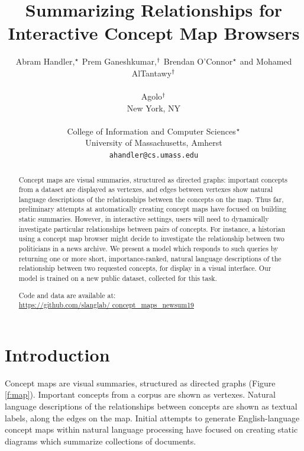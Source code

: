 \documentclass[11pt,a4paper]{article}
\title{Summarizing Relationships for Interactive Concept Map Browsers}
\author{Abram Handler,$^{\star}$ Prem Ganeshkumar,$^{\dagger}$ Brendan O'Connor$^{\star}$ and Mohamed AlTantawy$^{\dagger}$ \\ \\
Agolo$^{\dagger}$ \\ 
 New York, NY \\ \\
  College of Information and Computer Sciences$^{\star}$ \\
  University of Massachusetts, Amherst \\
  {\tt ahandler@cs.umass.edu} \\}
\date{}
\begin{document}
\maketitle



\maketitle\begin{abstract}
Concept maps are visual summaries, structured as directed graphs: important concepts from a dataset are displayed as vertexes, and edges between vertexes show natural language descriptions of the relationships between the concepts on the map. Thus far, preliminary attempts at automatically creating concept maps have focused on building static summaries. However, in interactive settings, users will need to dynamically investigate particular relationships between pairs of concepts. For instance, a historian using a concept map browser might decide to investigate the relationship between two politicians in a news archive. We present a model which responds to such queries by returning one or more short, importance-ranked, natural language descriptions of the relationship between two requested concepts, for display in a visual interface. Our model is trained on a new public dataset, collected for this task.

Code and data are available at:\\ \url{https://github.com/slanglab/ concept_maps_newsum19}
\end{abstract}


\section{Introduction}

Concept maps are visual summaries, structured as directed graphs (Figure \ref{f:map}). Important concepts from a corpus are shown as vertexes. Natural language descriptions of the relationships between concepts are shown as textual labels, along the edges on the map. Initial attempts to generate English-language concept maps within natural language processing \cite{emnlp2017conceptmaps} have focused on creating static diagrams which summarize collections of documents.
\end{document}
